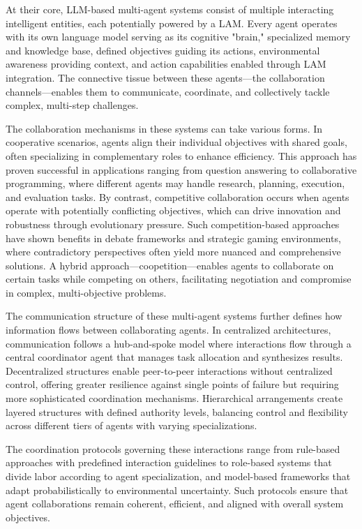 \documentclass[journal,twoside,10pt]{IEEEtran}
\begin{document}
At their core, LLM-based multi-agent systems consist of multiple interacting intelligent entities, each potentially powered by a LAM. Every agent operates with its own language model serving as its cognitive "brain," specialized memory and knowledge base, defined objectives guiding its actions, environmental awareness providing context, and action capabilities enabled through LAM integration. The connective tissue between these agents—the collaboration channels—enables them to communicate, coordinate, and collectively tackle complex, multi-step challenges.

The collaboration mechanisms in these systems can take various forms. In cooperative scenarios, agents align their individual objectives with shared goals, often specializing in complementary roles to enhance efficiency. This approach has proven successful in applications ranging from question answering to collaborative programming, where different agents may handle research, planning, execution, and evaluation tasks. By contrast, competitive collaboration occurs when agents operate with potentially conflicting objectives, which can drive innovation and robustness through evolutionary pressure. Such competition-based approaches have shown benefits in debate frameworks and strategic gaming environments, where contradictory perspectives often yield more nuanced and comprehensive solutions. A hybrid approach—coopetition—enables agents to collaborate on certain tasks while competing on others, facilitating negotiation and compromise in complex, multi-objective problems.

The communication structure of these multi-agent systems further defines how information flows between collaborating agents. In centralized architectures, communication follows a hub-and-spoke model where interactions flow through a central coordinator agent that manages task allocation and synthesizes results. Decentralized structures enable peer-to-peer interactions without centralized control, offering greater resilience against single points of failure but requiring more sophisticated coordination mechanisms. Hierarchical arrangements create layered structures with defined authority levels, balancing control and flexibility across different tiers of agents with varying specializations.

The coordination protocols governing these interactions range from rule-based approaches with predefined interaction guidelines to role-based systems that divide labor according to agent specialization, and model-based frameworks that adapt probabilistically to environmental uncertainty. Such protocols ensure that agent collaborations remain coherent, efficient, and aligned with overall system objectives.
\end{document}
